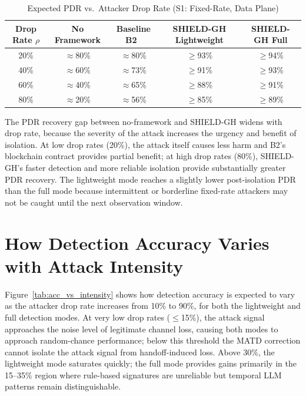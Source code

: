 \documentclass[12pt, a4paper]{report}
\begin{document}
\begin{table}[htbp]
\renewcommand{\arraystretch}{1.3}
\caption{Expected PDR vs.\ Attacker Drop Rate (S1: Fixed-Rate, Data Plane)}
\label{tab:pdr_vs_droprate}
\centering
\scriptsize
\begin{tabular}{|c|c|c|c|c|}
\hline
\textbf{Drop Rate $\rho$} & \textbf{No Framework} &
\textbf{Baseline B2~\cite{alabdulatif2024mitigating}} &
\textbf{SHIELD-GH Lightweight} & \textbf{SHIELD-GH Full} \\
\hline
20\% & $\approx$80\% & $\approx$80\% & $\geq$93\% & $\geq$94\% \\
40\% & $\approx$60\% & $\approx$73\% & $\geq$91\% & $\geq$93\% \\
60\% & $\approx$40\% & $\approx$65\% & $\geq$88\% & $\geq$91\% \\
80\% & $\approx$20\% & $\approx$56\% & $\geq$85\% & $\geq$89\% \\
\hline
\end{tabular}
\end{table}

The PDR recovery gap between no-framework and SHIELD-GH widens with drop rate,
because the severity of the attack increases the urgency and benefit of isolation.
At low drop rates (20\%), the attack itself causes less harm and B2's blockchain
contract provides partial benefit; at high drop rates (80\%), SHIELD-GH's faster
detection and more reliable isolation provide substantially greater PDR recovery.
The lightweight mode reaches a slightly lower post-isolation PDR than the full
mode because intermittent or borderline fixed-rate attackers may not be caught
until the next observation window.

\section{How Detection Accuracy Varies with Attack Intensity}

Figure~\ref{tab:acc_vs_intensity} shows how detection accuracy is expected to
vary as the attacker drop rate increases from 10\% to 90\%, for both the
lightweight and full detection modes. At very low drop rates ($\leq$15\%),
the attack signal approaches the noise level of legitimate channel loss,
causing both modes to approach random-chance performance; below this threshold
the MATD correction cannot isolate the attack signal from handoff-induced loss.
Above 30\%, the lightweight mode saturates quickly; the full mode provides
gains primarily in the 15--35\% region where rule-based signatures are unreliable
but temporal LLM patterns remain distinguishable.
\end{document}
